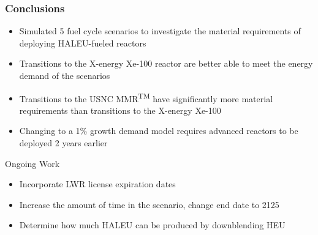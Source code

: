 \begin{frame}
    \frametitle{Conclusions}
    \begin{itemize}
        \item Simulated 5 fuel cycle scenarios to investigate the material 
              requirements of deploying \gls{HALEU}-fueled reactors
        \item Transitions to the X-energy Xe-100 reactor are better able to meet 
              the energy demand of the scenarios
        \item Transitions to the \gls{USNC} \gls{MMR}\textsuperscript{TM}
              have significantly more material requirements than transitions to 
              the X-energy Xe-100
        \item Changing to a 1\% growth demand model requires 
              advanced reactors to be deployed 2 years earlier
    \end{itemize}
    \begin{block}{Ongoing Work}
        \begin{itemize}
            \item Incorporate \gls{LWR} license expiration dates
            \item Increase the amount of time in the scenario, change end date to 2125
            \item Determine how much \gls{HALEU} can be produced by downblending \gls{HEU}
        \end{itemize}
    \end{block}
\end{frame}
